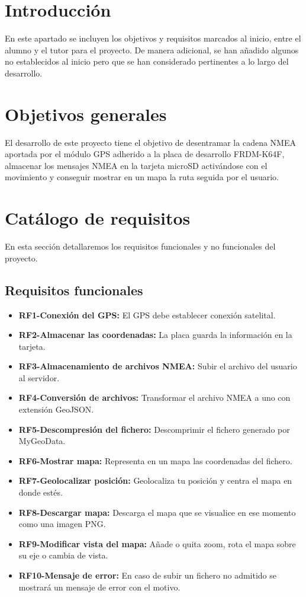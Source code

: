 
\section{Introducción}
En este apartado se incluyen los objetivos y requisitos marcados al inicio, entre el alumno y el tutor para el proyecto.
De manera adicional, se han añadido algunos no establecidos al inicio pero que se han considerado pertinentes a lo largo del desarrollo.

\section{Objetivos generales}
El desarrollo de este proyecto tiene el objetivo de desentramar la cadena NMEA aportada por el módulo GPS adherido a la placa de desarrollo FRDM-K64F, almacenar los mensajes NMEA en la tarjeta microSD activándose con el movimiento y conseguir mostrar en un mapa la ruta seguida por el usuario.

\section{Catálogo de requisitos}
En esta sección detallaremos los requisitos funcionales y no funcionales del proyecto.

\subsection{Requisitos funcionales}
\begin{itemize}
\tightlist
\item
    \textbf{RF1-Conexión del GPS:} El GPS debe establecer conexión satelital.
\item
    \textbf{RF2-Almacenar las coordenadas:} La placa guarda la información en la tarjeta.
\item
    \textbf{RF3-Almacenamiento de archivos NMEA:} Subir el archivo del usuario al servidor.
\item
    \textbf{RF4-Conversión de archivos:} Transformar el archivo NMEA a uno con extensión GeoJSON.
\item
    \textbf{RF5-Descompresión del fichero:} Descomprimir el fichero generado por MyGeoData.
\item
	\textbf{RF6-Mostrar mapa:} Representa en un mapa las coordenadas del fichero.
\item
    \textbf{RF7-Geolocalizar posición:} Geolocaliza tu posición y centra el mapa en donde estés.
\item
    \textbf{RF8-Descargar mapa:} Descarga el mapa que se visualice en ese momento como una imagen PNG.
\item
    \textbf{RF9-Modificar vista del mapa:} Añade o quita zoom, rota el mapa sobre su eje o cambia de vista.
\item  
    \textbf{RF10-Mensaje de error:} En caso de subir un fichero no admitido se mostrará un mensaje de error con el motivo.
\end{itemize}

